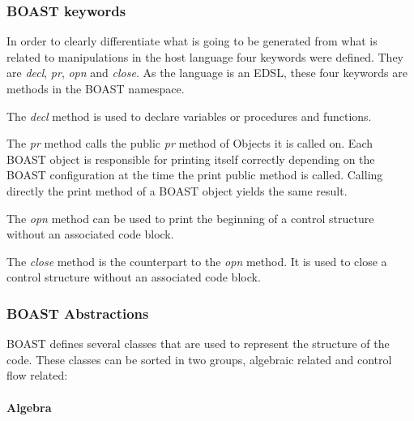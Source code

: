 \documentclass[11pt, a4paper, twoside]{montblanc}
\begin{document}
    \subsubsection{BOAST keywords}

In order to clearly differentiate what is going to be generated from what is
related to manipulations in the host language four keywords were defined. They
are \emph{decl}, \emph{pr}, \emph{opn} and \emph{close}. As the language is
an EDSL, these four keywords are methods in the BOAST namespace.

The \emph{decl} method is used to declare variables or procedures and functions.

The \emph{pr} method calls the public \emph{pr} method of Objects it is
called on. Each BOAST object is responsible for printing itself correctly
depending on the BOAST configuration at the time the print public method is
called. Calling directly the print method of a BOAST object yields the same
result.

The \emph{opn} method can be used to print the beginning of a control
structure without an associated code block.

The \emph{close} method is the counterpart to the \emph{opn} method. It is used
to close a control structure without an associated code block.

    \subsubsection{BOAST Abstractions}

BOAST defines several classes that are used to represent the structure of the
code. These classes can be sorted in two groups, algebraic related and control
flow related:

      \paragraph{Algebra}
\end{document}
